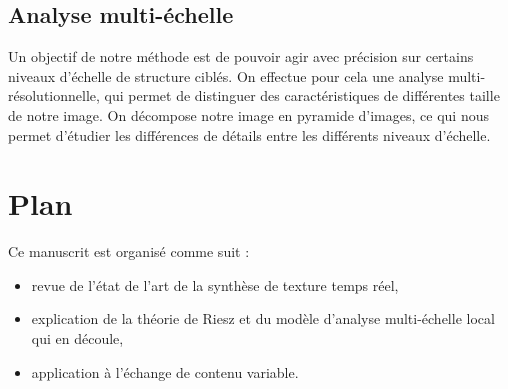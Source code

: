 \subsection*{Analyse multi-échelle}

Un objectif de notre méthode est de pouvoir agir avec précision sur certains niveaux d'échelle de structure ciblés. On effectue pour cela une analyse multi-résolutionnelle, qui permet de distinguer des caractéristiques de différentes taille de notre image. On décompose notre image en pyramide d'images, ce qui nous permet d'étudier les différences de détails entre les différents niveaux d'échelle.

\section{Plan} %

Ce manuscrit est organisé comme suit :

\begin{itemize}
    \item revue de l'état de l'art de la synthèse de texture temps réel,
    \item explication de la théorie de Riesz et du modèle d'analyse multi-échelle local qui en découle,
    \item application à l'échange de contenu variable.
\end{itemize}